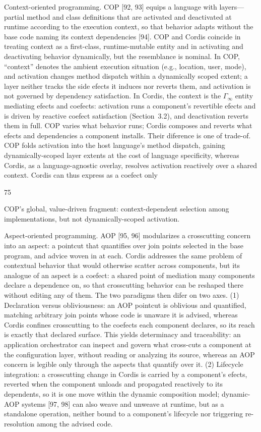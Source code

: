 \documentclass[
  10
]{article}
\begin{document}
Context-oriented programming. COP {[}92, 93{]} equips a language with
layers---partial method and class definitions that are activated and
deactivated at runtime according to the execution context, so that
behavior adapts without the base code naming its context dependencies
{[}94{]}. COP and Cordis coincide in treating context as a first-class,
runtime-mutable entity and in activating and deactivating behavior
dynamically, but the resemblance is nominal. In COP, ``context'' denotes
the ambient execution situation (e.g., location, user, mode), and
activation changes method dispatch within a dynamically scoped extent; a
layer neither tracks the side efects it induces nor reverts them, and
activation is not governed by dependency satisfaction. In Cordis, the
context is the \(\Gamma _ { \infty }\) entity mediating efects and
coefects: activation runs a component's revertible efects and is driven
by reactive coefect satisfaction (Section~3.2), and deactivation reverts
them in full. COP varies what behavior runs; Cordis composes and reverts
what efects and dependencies a component installs. Their diference is
one of trade-of. COP folds activation into the host language's method
dispatch, gaining dynamically-scoped layer extents at the cost of
language specificity, whereas Cordis, as a language-agnostic overlay,
resolves activation reactively over a shared context. Cordis can thus
express as a coefect only

75

COP's global, value-driven fragment: context-dependent selection among
implementations, but not dynamically-scoped activation.

Aspect-oriented programming. AOP {[}95, 96{]} modularizes a crosscutting
concern into an aspect: a pointcut that quantifies over join points
selected in the base program, and advice woven in at each. Cordis
addresses the same problem of contextual behavior that would otherwise
scatter across components, but its analogue of an aspect is a coefect: a
shared point of mediation many components declare a dependence on, so
that crosscutting behavior can be reshaped there without editing any of
them. The two paradigms then difer on two axes. (1) Declaration versus
obliviousness: an AOP pointcut is oblivious and quantified, matching
arbitrary join points whose code is unaware it is advised, whereas
Cordis confines crosscutting to the coefects each component declares, so
its reach is exactly that declared surface. This yields determinacy and
traceability: an application orchestrator can inspect and govern what
cross-cuts a component at the configuration layer, without reading or
analyzing its source, whereas an AOP concern is legible only through the
aspects that quantify over it. (2) Lifecycle integration: a crosscutting
change in Cordis is carried by a component's efects, reverted when the
component unloads and propagated reactively to its dependents, so it is
one move within the dynamic composition model; dynamic-AOP systems
{[}97, 98{]} can also weave and unweave at runtime, but as a standalone
operation, neither bound to a component's lifecycle nor triggering
re-resolution among the advised code.
\end{document}
